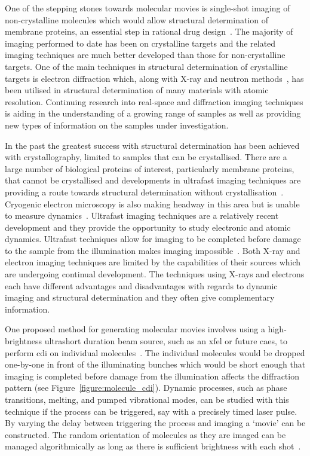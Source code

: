 One of the stepping stones towards molecular movies is single-shot imaging of non-crystalline molecules which would allow structural determination of membrane proteins, an essential step in rational drug design~\cite{hardy_atomic_1987, barrett_discovering_1999, pinto_influenza_1992}.
The majority of imaging performed to date has been on crystalline targets and the related imaging techniques are much better developed than those for non-crystalline targets.
One of the main techniques in structural determination of crystalline targets is electron diffraction which, along with X-ray and neutron methods~\cite{cullity_elements_2001,bacon_x-ray_2013}, has been utilised in structural determination of many materials with atomic resolution.
Continuing research into real-space and diffraction imaging techniques is aiding in the understanding of a growing range of samples as well as providing new types of information on the samples under investigation.

In the past the greatest success with structural determination has been achieved with crystallography, limited to samples that can be crystallised.
There are a large number of biological proteins of interest, particularly membrane proteins, that cannot be crystallised and developments in ultrafast imaging techniques are providing a route towards structural determination without crystallisation~\cite{dauter_current_2006,levitt_nature_2009}.
Cryogenic electron microscopy is also making headway in this area but is unable to measure dynamics~\cite{henderson_model_1990,zhou_towards_2008}.
Ultrafast imaging techniques are a relatively recent development and they provide the opportunity to study electronic and atomic dynamics.
Ultrafast techniques allow for imaging to be completed before damage to the sample from the illumination makes imaging impossible~\cite{gaffney_imaging_2007,barty_ultrafast_2008,miao_beyond_2015}.
Both X-ray and electron imaging techniques are limited by the capabilities of their sources which are undergoing continual development.
The techniques using X-rays and electrons each have different advantages and disadvantages with regards to dynamic imaging and structural determination and they often give complementary information.

One proposed method for generating molecular movies involves using a high-brightness ultrashort duration beam source, such as an \gls{xfel} or future \gls{caes}, to perform \gls{cdi} on individual molecules~\cite{chapman_femtosecond_2006,dwyer_femtosecond_2006,gaffney_imaging_2007}.
The individual molecules would be dropped one-by-one in front of the illuminating bunches which would be short enough that imaging is completed before damage from the illumination affects the diffraction pattern (see Figure~\ref{figure:molecule_cdi}).
Dynamic processes, such as phase transitions, melting, and pumped vibrational modes, can be studied with this technique if the process can be triggered, say with a precisely timed laser pulse.
By varying the delay between triggering the process and imaging a `movie' can be constructed.
The random orientation of molecules as they are imaged can be managed algorithmically as long as there is sufficient brightness with each shot~\cite{yefanov_orientation_2013}.

